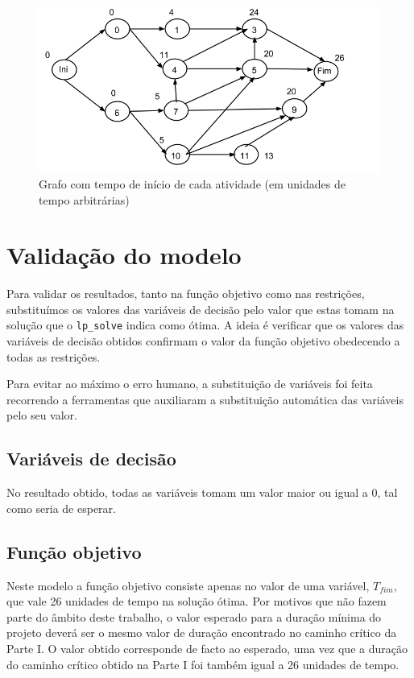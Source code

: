 \begin{figure}[<+htpb+>] \centering
	\includegraphics[scale=0.5]{./img/p2_tempos_inicio} \caption{Grafo com
	tempo de início de cada atividade (em unidades de tempo arbitrárias)}
\label{p2:fig:tempos_inicio}
 \end{figure}


\section{Validação do modelo}

Para validar os resultados, tanto na função objetivo como nas restrições,
substituímos os valores das variáveis de decisão pelo valor que estas tomam na
solução que o \texttt{lp\_solve} indica como ótima. A ideia é verificar que os valores das
variáveis de decisão obtidos confirmam o valor da função objetivo obedecendo
a todas as restrições.

Para evitar ao máximo o erro humano, a substituição de variáveis foi feita
recorrendo a ferramentas que auxiliaram a substituição automática das variáveis
pelo seu valor.

\subsection{Variáveis de decisão}

No resultado obtido, todas as variáveis tomam um valor maior ou igual a 0, tal
como seria de esperar.

\subsection{Função objetivo}

Neste modelo a função objetivo consiste apenas no valor de uma variável,
$T_{fim}$, que vale 26 unidades de tempo na solução ótima. Por motivos que não fazem parte do
âmbito deste trabalho, o valor esperado para a duração mínima
do projeto deverá ser o mesmo valor de duração encontrado no caminho crítico da
Parte I. O valor obtido corresponde de facto ao esperado, uma vez que a duração do
caminho crítico obtido na Parte I foi também igual a 26 unidades de tempo.



